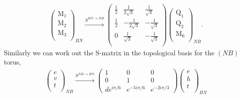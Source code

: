 \documentclass[12pt,a4paper]{article}
\newcounter{arrow}
\begin{document}
\begin{align}\left( \begin{matrix}
\text{M}_1\\
\text{M}_2\\
\text{M}_3\\
\end{matrix} \right)_{BN}
\xrightarrow{S^{BN \rightarrow NB}}
\left( \begin{matrix}
\frac{1}{2} & \frac{1}{2 \sqrt{3}} &  \frac{1}{\sqrt{3}} \\
\frac{1}{2} & - \frac{1}{2\sqrt{3}} & -\frac{1}{\sqrt{3}} \\
0& \frac{1}{\sqrt{3}} & -\frac{1}{\sqrt{3}} \\
\end{matrix} \right)
\left( \begin{matrix}
\text{Q}_1\\
\text{Q}_2\\
\text{M}_6\\
\end{matrix} \right)_{NB}.
\end{align}
Similarly we can work out the S-matrix in the topological basis for the $(NB)$ torus,
\begin{align}
\left( \begin{matrix}
e \\ 
v\\ 
t\\ 
\end{matrix} \right)_{NB}
  \xrightarrow{S^{NB \rightarrow BN}}
\left( \begin{matrix}
1&0&0\\
0&1&0\\
de^{i \pi/6} & e^{-5 i \pi /6} & e^{-2 i \pi /3}
\end{matrix} \right)
\left( \begin{matrix}
e \\
h\\ 
t\\ 
\end{matrix} \right)_{BN} 
\end{align}
\end{document}

